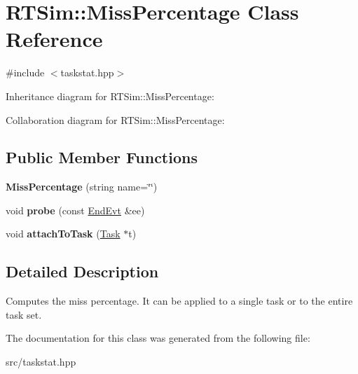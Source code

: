 \hypertarget{classRTSim_1_1MissPercentage}{}\section{R\+T\+Sim\+:\+:Miss\+Percentage Class Reference}
\label{classRTSim_1_1MissPercentage}


{\ttfamily \#include $<$taskstat.\+hpp$>$}



Inheritance diagram for R\+T\+Sim\+:\+:Miss\+Percentage\+:


Collaboration diagram for R\+T\+Sim\+:\+:Miss\+Percentage\+:
\subsection*{Public Member Functions}
\begin{DoxyCompactItemize}
\item 
{\bfseries Miss\+Percentage} (string name=\char`\"{}\char`\"{})\hypertarget{classRTSim_1_1MissPercentage_a47b3203a287b914bc9f95c1be4e71c71}{}\label{classRTSim_1_1MissPercentage_a47b3203a287b914bc9f95c1be4e71c71}

\item 
void {\bfseries probe} (const \hyperlink{classRTSim_1_1EndEvt}{End\+Evt} \&ee)\hypertarget{classRTSim_1_1MissPercentage_acc28590d8f61586be54246398496ec4d}{}\label{classRTSim_1_1MissPercentage_acc28590d8f61586be54246398496ec4d}

\item 
void {\bfseries attach\+To\+Task} (\hyperlink{classRTSim_1_1Task}{Task} $\ast$t)\hypertarget{classRTSim_1_1MissPercentage_a2ee97f5f839f5301a76d7982b22b39b0}{}\label{classRTSim_1_1MissPercentage_a2ee97f5f839f5301a76d7982b22b39b0}

\end{DoxyCompactItemize}


\subsection{Detailed Description}
Computes the miss percentage. It can be applied to a single task or to the entire task set. 

The documentation for this class was generated from the following file\+:\begin{DoxyCompactItemize}
\item 
src/taskstat.\+hpp\end{DoxyCompactItemize}
